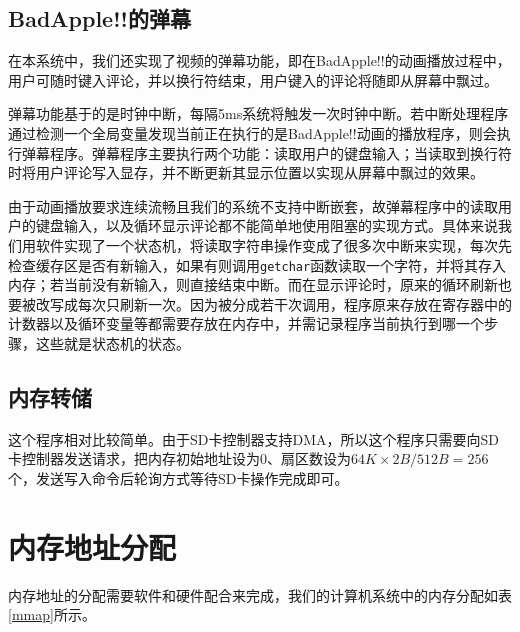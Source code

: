 \documentclass[11pt,utf8]{report}
\begin{document}
\subsection{BadApple!!的弹幕}

在本系统中，我们还实现了视频的弹幕功能，即在BadApple!!的动画播放过程中，用户可随时键入评论，并以换行符结束，用户键入的评论将随即从屏幕中飘过。

弹幕功能基于的是时钟中断，每隔5ms系统将触发一次时钟中断。若中断处理程序通过检测一个全局变量发现当前正在执行的是BadApple!!动画的播放程序，则会执行弹幕程序。弹幕程序主要执行两个功能：读取用户的键盘输入；当读取到换行符时将用户评论写入显存，并不断更新其显示位置以实现从屏幕中飘过的效果。

由于动画播放要求连续流畅且我们的系统不支持中断嵌套，故弹幕程序中的读取用户的键盘输入，以及循环显示评论都不能简单地使用阻塞的实现方式。具体来说我们用软件实现了一个状态机，将读取字符串操作变成了很多次中断来实现，每次先检查缓存区是否有新输入，如果有则调用\texttt{getchar}函数读取一个字符，并将其存入内存；若当前没有新输入，则直接结束中断。而在显示评论时，原来的循环刷新也要被改写成每次只刷新一次。因为被分成若干次调用，程序原来存放在寄存器中的计数器以及循环变量等都需要存放在内存中，并需记录程序当前执行到哪一个步骤，这些就是状态机的状态。

\subsection{内存转储}
	\par 这个程序相对比较简单。由于SD卡控制器支持DMA，所以这个程序只需要向SD卡控制器发送请求，把内存初始地址设为0、扇区数设为$64K \times 2B / 512B = 256$个，发送写入命令后轮询方式等待SD卡操作完成即可。

\section{内存地址分配}

内存地址的分配需要软件和硬件配合来完成，我们的计算机系统中的内存分配如表\ref{mmap}所示。
\end{document}

